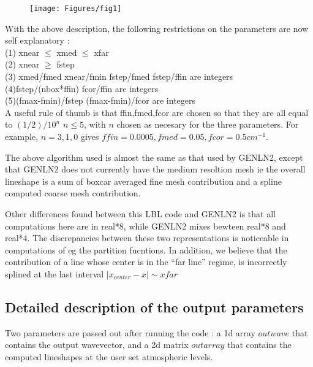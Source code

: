 \documentclass[11pt]{article}
\begin{document}
\begin{figure}
  \begin{center}\texttt{[image: Figures/fig1]}\end{center}
  \caption[Cartoon of Parameter Relations]{}
  \label{fig:cartoon_param}
\end{figure}

With the above description, the following restrictions on the parameters are
now self explanatory : \\
(1) xnear $\le$ xmed $\le$ xfar        \\
(2) xnear $\ge$ fstep              \\
(3) xmed/fmed  xnear/fmin   fstep/fmed   fstep/ffin       are integers \\
(4)fstep/(nbox*ffin)        fcor/ffin                     are integers \\
(5)(fmax-fmin)/fstep        (fmax-fmin)/fcor              are integers \\

A useful rule of thumb is that ffin,fmed,fcor are chosen so that they 
are all equal to $(1/2)/10^{n}$   $n \le 5$, with $n$ chosen as necesary for 
the three parameters. For example, $n=3,1,0$ gives $ffin=0.0005,fmed=0.05,
fcor=0.5 cm^{-1}$.

The above algorithm used is almost the same as that used by GENLN2, except 
that GENLN2 does not currently have the medium resoltion mesh ie the overall 
lineshape is a sum of boxcar averaged fine mesh contribution and a spline
computed coarse mesh contribution.

Other differences found between this LBL code and GENLN2 is that all 
computations here are in real*8, while GENLN2 mixes bewteen real*8 and 
real*4. 
The discrepancies between these two representations is noticeable in 
computations of eg the partition fucntions. In addition, we believe that the
contribution of a line whose center is in the ``far line'' regime, is 
incorrectly splined at the last interval $|x_{center} - x| \sim xfar$

\subsection{Detailed description of the output parameters}
Two parameters are passed out after running the code : a 1d array $outwave$ 
that contains the output wavevector, and a 2d matrix $outarray$ that 
contains the computed lineshapes at the user set atmospheric levels.
\end{document}
